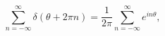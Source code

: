\begin{equation}
\sum_{n=-\infty}^{\infty}\delta(\theta +2\pi n)=
\frac{1}{2\pi}\sum_{n=-\infty}^{\infty}e^{in\theta},
\label{pformula}
\end{equation}

